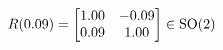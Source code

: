 \documentclass[preview]{standalone}
\begin{document}
\begin{align*}
\special{dvisvgm:raw <g id='unique000'>}R(0.09) = \begin{bmatrix} 1.00 & -0.09 \\ 0.09 & 1.00 \end{bmatrix} \in \text{SO}(2)\special{dvisvgm:raw </g>}
\end{align*}
\end{document}
